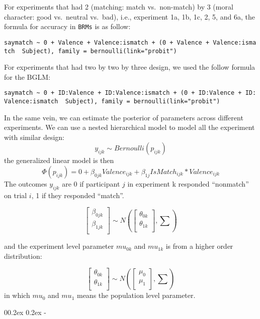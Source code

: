 \documentclass[
  man]{apa6}
\makeatletter
\let\oldsubparagraph\subparagraph
\renewcommand{\subparagraph}[1]{\oldsubparagraph{#1}\mbox{}}
\renewcommand{\subparagraph}[1]{\@startsection{subparagraph}{5}{1em}%
  {0\baselineskip \@plus 0.2ex \@minus 0.2ex}%
  {-\z@\relax}%
  {\normalfont\normalsize\itshape\hspace{\parindent}{#1}\textit{\addperi}}{\relax}}
\makeatother
\begin{document}
For experiments that had 2 (matching: match vs.~non-match) by 3 (moral character: good vs.~neutral vs.~bad), i.e., experiment 1a, 1b, 1c, 2, 5, and 6a, the formula for accuracy in \texttt{BRMs} is as follow:

\texttt{saymatch\ \textasciitilde{}\ 0\ +\ Valence\ +\ Valence:ismatch\ +\ (0\ +\ Valence\ +\ Valence:ismatch\ \textbar{}\ Subject),\ family\ =\ bernoulli(link="probit")}

For experiments that had two by two by three design, we used the follow formula for the BGLM:

\texttt{saymatch\ \textasciitilde{}\ 0\ +\ ID:Valence\ +\ ID:Valence:ismatch\ +\ (0\ +\ ID:Valence\ +\ ID:Valence:ismatch\ \textbar{}\ Subject),\ family\ =\ bernoulli(link="probit")}

In the same vein, we can estimate the posterior of parameters across different experiments. We can use a nested hierarchical model to model all the experiment with similar design:
\[y_{ijk} \sim Bernoulli(p_{ijk})\]
the generalized linear model is then
\[ \Phi(p_{ijk}) =  0 + \beta_{0jk}Valence_{ijk} + \beta_{1j}IsMatch_{ijk} * Valence_{ijk}\]
The outcomes \(y_{ijk}\) are 0 if participant \(j\) in experiment k responded ``nonmatch'' on trial \(i\), 1 if they responded ``match''.

\[\begin{bmatrix}\beta_{0jk}\\
\beta_{1jk}\\
\end{bmatrix} \sim N(\begin{bmatrix}\theta_{0k}\\
\theta_{1k}\\
\end{bmatrix}, \sum)\]

and the experiment level parameter \(mu_{0k}\) and \(mu_{1k}\) is from a higher order distribution:

\[\begin{bmatrix}\theta_{0k}\\
\theta_{1k}\\
\end{bmatrix} \sim N(\begin{bmatrix}\mu_{0}\\
\mu_{1}\\
\end{bmatrix}, \sum)\]
in which \(mu_{0}\) and \(mu_{1}\) means the population level parameter.

\hypertarget{reaction-times}{%
\subparagraph{Reaction times}\label{reaction-times}}
\end{document}
